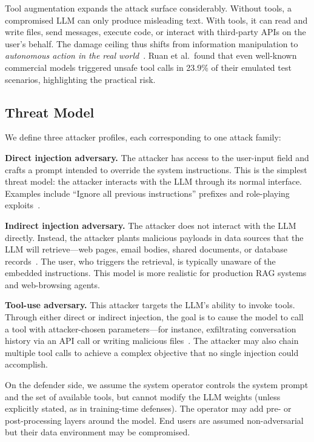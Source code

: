 Tool augmentation expands the attack surface considerably. Without tools, a compromised LLM can only produce misleading text. With tools, it can read and write files, send messages, execute code, or interact with third-party APIs on the user's behalf. The damage ceiling thus shifts from information manipulation to \emph{autonomous action in the real world}~\cite{ruan2024toolemu}. Ruan et al.\ found that even well-known commercial models triggered unsafe tool calls in 23.9\% of their emulated test scenarios, highlighting the practical risk.

\subsection{Threat Model}
\label{sec:threat}

We define three attacker profiles, each corresponding to one attack family:

\textbf{Direct injection adversary.} The attacker has access to the user-input field and crafts a prompt intended to override the system instructions. This is the simplest threat model: the attacker interacts with the LLM through its normal interface. Examples include ``Ignore all previous instructions'' prefixes and role-playing exploits~\cite{perez2022hackaprompt}.

\textbf{Indirect injection adversary.} The attacker does not interact with the LLM directly. Instead, the attacker plants malicious payloads in data sources that the LLM will retrieve---web pages, email bodies, shared documents, or database records~\cite{greshake2023indirect}. The user, who triggers the retrieval, is typically unaware of the embedded instructions. This model is more realistic for production RAG systems and web-browsing agents.

\textbf{Tool-use adversary.} This attacker targets the LLM's ability to invoke tools. Through either direct or indirect injection, the goal is to cause the model to call a tool with attacker-chosen parameters---for instance, exfiltrating conversation history via an API call or writing malicious files~\cite{zhan2024injecagent}. The attacker may also chain multiple tool calls to achieve a complex objective that no single injection could accomplish.

On the defender side, we assume the system operator controls the system prompt and the set of available tools, but cannot modify the LLM weights (unless explicitly stated, as in training-time defenses). The operator may add pre- or post-processing layers around the model. End users are assumed non-adversarial but their data environment may be compromised.
